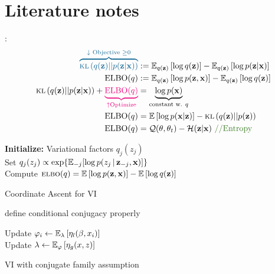 \section{Literature notes}

: \cite{blei2016variational} \INPROGRESS \\
\begin{align}
  \blue{\overbrace{\kl{q(\bz)||p(\bz|\bx)}}^{\downarrow\text{ Objective } \geq 0} } &:= 
  \EEE{q(\bz)}{\log q(\bz)} - \EEE{q(\bz)}{\log p(\bz | \bx)} \\
  \text{ELBO}(q) &:= \EEE{q(\bz)}{\log p(\bz, \bx)} - \EEE{q(\bz)}{\log q(\bz)} \\
  \kl{q(\bz)||p(\bz|\bx)} + \magenta{\underbrace{\text{ELBO}(q)}_{\uparrow \text{Optimize}}}
                 &= \underbrace{\log p(\bx)}_{\text{constant w. } q} \\
  \text{ELBO}(q) &= \EE{\log p(\bx | \bz)} - \kl{q(\bz) || p(\bz)} \\
  \text{ELBO}(q) &= \cQ(\theta, \theta_t) - \mathcal{H}(\bz|\bx) \text{ \comment{ //Entropy}}\\
\end{align}
\begin{algorithm}[h]
  \textbf{Initialize:} Variational factors $q_{j}(z_j)$ \\
   {
     {
      Set $q_{j}(z_j) \propto \exp\{\mathbb{E}_{-j}[\log p(z_j \,\vert\, \mathbf{z}_{-j}, \mathbf{x})]\}$\\
    }
    Compute $\textsc{elbo}(q) = \mathbb{E}\left[\log p(\mathbf{z}, \mathbf{x})\right] - \mathbb{E}\left[\log q(\mathbf{z})\right]$
  }
  \caption{Coordinate Ascent for VI}
  \label{alg:cavi}
\end{algorithm}

 \cite{pgmai18}
\TODO define conditional conjugacy properly
\begin{algorithm}[h]
   {
     {
      Update $\varphi_i \gets \mathbb{E}_{\lambda}\left[\eta_l(\beta, x_i)\right]$\\
    }
    Update $\lambda \gets \mathbb{E}_{\varphi}\left[\eta_g(x, z)\right]$\\
  }
  \caption{VI with conjugate family assumption}
  \label{alg:vi_conj}
\end{algorithm}

